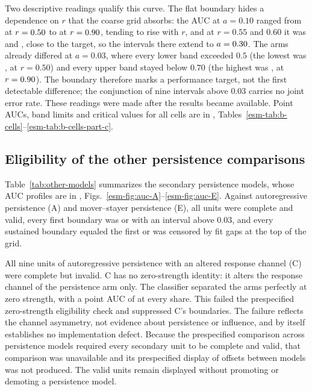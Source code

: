 



Two descriptive readings qualify this curve. The flat boundary hides a dependence on $r$ that the coarse grid absorbs: the AUC at $a=0.10$ ranged from  at $r=\resultnum{j.b.a1000.auc.min.r}{0.50}$ to  at $r=\resultnum{j.b.a1000.auc.max.r}{0.90}$, tending to rise with $r$, and at $r=0.55$ and $0.60$ it was  and , close to the target, so the intervals there extend to $a=\resultnum{j.b.r055.first.upper}{0.30}$. The arms already differed at $a=0.03$, where every lower band exceeded $0.5$ (the lowest was , at $r=0.50$) and every upper band stayed below $0.70$ (the highest was , at $r=\resultnum{j.b.a0300.upper.max.r}{0.90}$). The boundary therefore marks a performance target, not the first detectable difference; the conjunction of nine intervals above $0.03$ carries no joint error rate. These readings were made after the results became available. Point AUCs, band limits and critical values for all  cells are in \esmresource, Tables~\ref{esm-tab:b-cells}--\ref{esm-tab:b-cells-part-c}.

\subsection{Eligibility of the other persistence comparisons}\label{sec:results-other}

Table~\ref{tab:other-models} summarizes the secondary persistence models, whose AUC profiles are in \esmresource, Figs.~\ref{esm-fig:auc-A}--\ref{esm-fig:auc-E}. Against autoregressive persistence (A) and mover--stayer persistence (E), all units were complete and valid, every first boundary was  or  with an interval above $0.03$, and every sustained boundary equaled the first or was censored by fit gaps at the top of the grid.



All nine units of autoregressive persistence with an altered response channel (C) were complete but invalid. C has no zero-strength identity: it alters the response channel of the persistence arm only. The classifier separated the arms perfectly at zero strength, with a point AUC of  at every share. This failed the prespecified zero-strength eligibility check and suppressed C's boundaries. The failure reflects the channel asymmetry, not evidence about persistence or influence, and by itself establishes no implementation defect. Because the prespecified comparison across persistence models required every secondary unit to be complete and valid, that comparison was unavailable and its prespecified display of offsets between models was not produced. The valid units remain displayed without promoting or demoting a persistence model.

